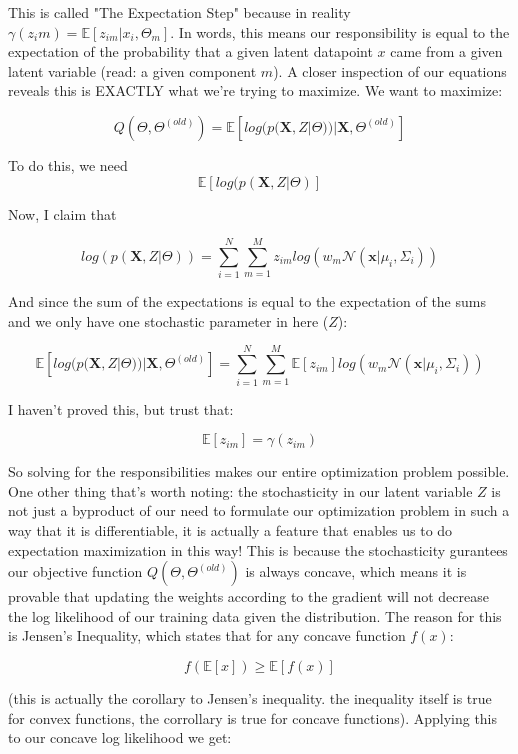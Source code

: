 \documentclass[12pt]{article}
\begin{document}
This is called "The Expectation Step" because in reality \(\gamma(z_im) = \mathbb{E}[z_{im} | x_i, \Theta_m]\). In words, this means our responsibility is equal to the expectation of the probability that a given latent datapoint \(x\) came from a given latent variable (read: a given component \(m\)). A closer inspection of our equations reveals this is EXACTLY what we're trying to maximize. We want to maximize: 


\[Q(\Theta, \Theta^{(old)}) = \mathbb{E}\left[log(p(\mathbf{X}, Z | \Theta)) | \mathbf{X}, \Theta^{(old)}\right]\]

To do this, we need 
\[\mathbb{E}\left[log(p(\mathbf{X}, Z | \Theta)\right]\]

Now, I claim that

\[log(p(\mathbf{X}, Z | \Theta)) = \sum_{i=1}^N \sum_{m=1}^M z_{im} log\left( w_m \mathcal{N}(\mathbf{x}|\mu_i, \Sigma_i) \right)  \]

And since the sum of the expectations is equal to the expectation of the sums and we only have one stochastic parameter in here (\(Z\)):

\[ \mathbb{E}\left[log(p(\mathbf{X}, Z | \Theta)) | \mathbf{X}, \Theta^{(old)}\right] = \sum_{i=1}^N \sum_{m=1}^M \mathbb{E}[z_{im}] log\left( w_m \mathcal{N}(\mathbf{x}|\mu_i, \Sigma_i) \right) \]

I haven't proved this, but trust that:

\[\mathbb{E}[z_{im}]  = \gamma(z_{im})\]

So solving for the responsibilities makes our entire optimization problem possible. \\

One other thing that's worth noting: the stochasticity in our latent variable \(Z\) is not just a byproduct of our need to formulate our optimization problem in such a way that it is differentiable, it is actually a feature that enables us to do expectation maximization in this way! This is because the stochasticity gurantees our objective function \(Q(\Theta, \Theta^{(old)})\) is always concave, which means it is provable that updating the weights according to the gradient will not decrease the log likelihood of our training data given the distribution. The reason for this is Jensen's Inequality, which states that for any concave function \(f(x)\):

\[ f(\mathbb{E}[x]) \geq \mathbb{E}[f(x)]\]

(this is actually the corollary to Jensen's inequality. the inequality itself is true for convex functions, the corrollary is true for concave functions). Applying this to our concave log likelihood we get:
\end{document}
